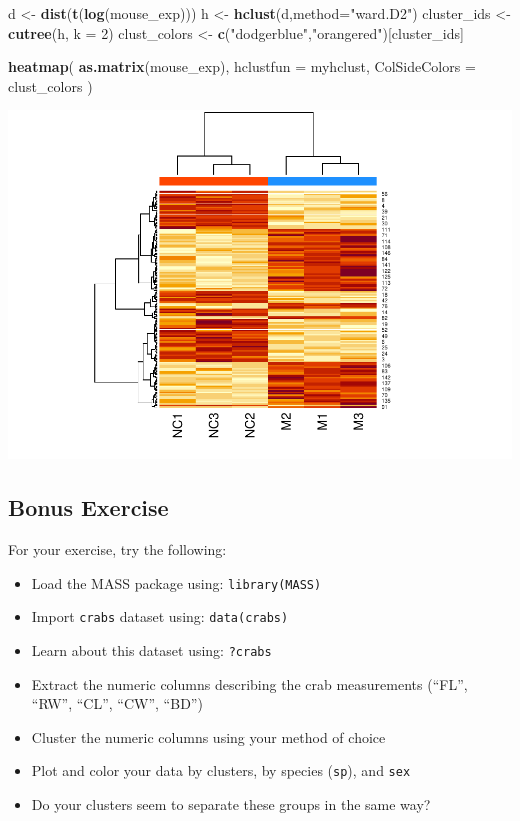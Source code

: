 \documentclass[
]{book}
\newenvironment{Shaded}{\begin{snugshade}}{\end{snugshade}}
\newcommand{\AttributeTok}[1]{\textcolor[rgb]{0.13,0.29,0.53}{#1}}
\newcommand{\DecValTok}[1]{\textcolor[rgb]{0.00,0.00,0.81}{#1}}
\newcommand{\FunctionTok}[1]{\textcolor[rgb]{0.13,0.29,0.53}{\textbf{#1}}}
\newcommand{\NormalTok}[1]{#1}
\newcommand{\OtherTok}[1]{\textcolor[rgb]{0.56,0.35,0.01}{#1}}
\newcommand{\StringTok}[1]{\textcolor[rgb]{0.31,0.60,0.02}{#1}}
\providecommand{\tightlist}{%
  \setlength{\itemsep}{0pt}\setlength{\parskip}{0pt}}
\begin{document}
\begin{Shaded}
\begin{Highlighting}[]
\NormalTok{d }\OtherTok{\textless{}{-}} \FunctionTok{dist}\NormalTok{(}\FunctionTok{t}\NormalTok{(}\FunctionTok{log}\NormalTok{(mouse\_exp)))}
\NormalTok{h }\OtherTok{\textless{}{-}} \FunctionTok{hclust}\NormalTok{(d,}\AttributeTok{method=}\StringTok{"ward.D2"}\NormalTok{)}
\NormalTok{cluster\_ids }\OtherTok{\textless{}{-}} \FunctionTok{cutree}\NormalTok{(h, }\AttributeTok{k =} \DecValTok{2}\NormalTok{)}
\NormalTok{clust\_colors }\OtherTok{\textless{}{-}} \FunctionTok{c}\NormalTok{(}\StringTok{"dodgerblue"}\NormalTok{,}\StringTok{"orangered"}\NormalTok{)[cluster\_ids]}

\FunctionTok{heatmap}\NormalTok{(}
    \FunctionTok{as.matrix}\NormalTok{(mouse\_exp),}
    \AttributeTok{hclustfun =}\NormalTok{ myhclust,}
    \AttributeTok{ColSideColors =}\NormalTok{ clust\_colors}
\NormalTok{)}
\end{Highlighting}
\end{Shaded}

\includegraphics{_main_files/figure-latex/unnamed-chunk-26-1.pdf}

\subsection{Bonus Exercise}\label{bonus-exercise}

For your exercise, try the following:

\begin{itemize}
\tightlist
\item
  Load the MASS package using: \texttt{library(MASS)}
\item
  Import \texttt{crabs} dataset using: \texttt{data(crabs)}
\item
  Learn about this dataset using: \texttt{?crabs}
\item
  Extract the numeric columns describing the crab measurements (``FL'', ``RW'', ``CL'', ``CW'', ``BD'')
\item
  Cluster the numeric columns using your method of choice
\item
  Plot and color your data by clusters, by species (\texttt{sp}), and \texttt{sex}
\item
  Do your clusters seem to separate these groups in the same way?
\end{itemize}
\end{document}
